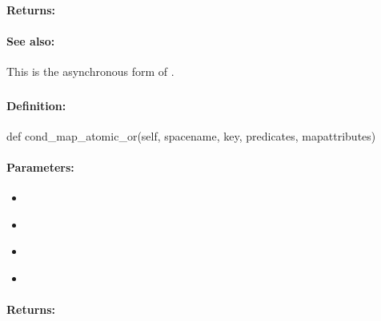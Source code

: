 \paragraph{Returns:}


\paragraph{See also:}  This is the asynchronous form of .

\pagebreak
\subsubsection{}
\label{api:python:cond_map_atomic_or}


\paragraph{Definition:}
\begin{pythoncode}
def cond_map_atomic_or(self, spacename, key, predicates, mapattributes)
\end{pythoncode}

\paragraph{Parameters:}
\begin{itemize}[noitemsep]
\item {}\\

\item {}\\

\item {}\\

\item {}\\

\end{itemize}

\paragraph{Returns:}


